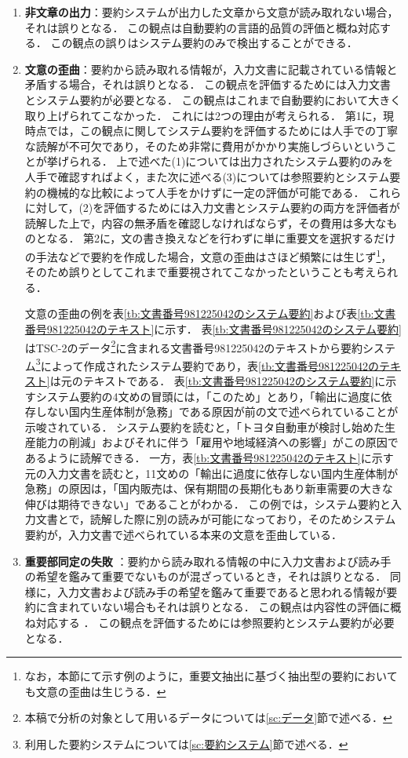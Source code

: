 \begin{enumerate}
\item
{\bf 非文章の出力}：要約システムが出力した文章から文意が読み取れない場合，それは誤りとなる．
この観点は自動要約の言語的品質の評価\cite{nist07,nenkova11}と概ね対応する．
この観点の誤りはシステム要約のみで検出することができる．

\item
{\bf 文意の歪曲}：要約から読み取れる情報が，入力文書に記載されている情報と矛盾する場合，それは誤りとなる．
この観点を評価するためには入力文書とシステム要約が必要となる．
この観点はこれまで自動要約において大きく取り上げられてこなかった．
これには2つの理由が考えられる．
第1に，現時点では，この観点に関してシステム要約を評価するためには人手での丁寧な読解が不可欠であり，そのため非常に費用がかかり実施しづらいということが挙げられる．
上で述べた(1)については出力されたシステム要約のみを人手で確認すればよく，また次に述べる(3)については参照要約とシステム要約の機械的な比較によって人手をかけずに一定の評価が可能である．
これらに対して，(2)を評価するためには入力文書とシステム要約の両方を評価者が読解した上で，内容の無矛盾を確認しなければならず，その費用は多大なものとなる．
第2に，文の書き換えなどを行わずに単に重要文を選択するだけの手法などで要約を作成した場合，文意の歪曲はさほど頻繁には生じず\footnote{
なお，本節にて示す例のように，重要文抽出に基づく抽出型の要約においても文意の歪曲は生じうる．}，
そのため誤りとしてこれまで重要視されてこなかったということも考えられる．

文意の歪曲の例を表\ref{tb:文書番号981225042のシステム要約}および表\ref{tb:文書番号981225042のテキスト}に示す．
表\ref{tb:文書番号981225042のシステム要約}はTSC-2のデータ\footnote{本稿で分析の対象として用いるデータについては\ref{sc:データ}節で述べる．}に含まれる文書番号981225042のテキストから要約システム\footnote{利用した要約システムについては\ref{sc:要約システム}節で述べる．}によって作成されたシステム要約であり，\mbox{表\ref{tb:文書番号981225042のテキスト}}は元のテキストである．
表\ref{tb:文書番号981225042のシステム要約}に示すシステム要約の4文めの冒頭には，「このため」とあり，「輸出に過度に依存しない国内生産体制が急務」である原因が前の文で述べられていることが示唆されている．
システム要約を読むと，「トヨタ自動車が検討し始めた生産能力の削減」およびそれに伴う「雇用や地域経済への影響」がこの原因であるように読解できる．
一方，表\ref{tb:文書番号981225042のテキスト}に示す元の入力文書を読むと，11文めの「輸出に過度に依存しない国内生産体制が急務」の原因は，「国内販売は、保有期間の長期化もあり新車需要の大きな伸びは期待できない」であることがわかる．
この例では，システム要約と入力文書とで，読解した際に別の読みが可能になっており，そのためシステム要約が，入力文書で述べられている本来の文意を歪曲している．
\item
{\bf 重要部同定の失敗}
：要約から読み取れる情報の中に入力文書および読み手の希望を鑑みて重要でないものが混ざっているとき，それは誤りとなる．
同様に，入力文書および読み手の希望を鑑みて重要であると思われる情報が要約に含まれていない場合もそれは誤りとなる．
この観点は内容性の評価に概ね対応する \cite{nenkova11} ．
この観点を評価するためには参照要約とシステム要約が必要となる．
\end{enumerate}

